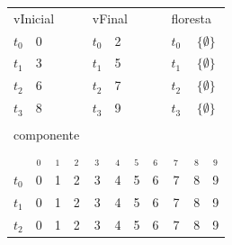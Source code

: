 \documentclass[12pt]{article}
\begin{document}
\begin{figure}[h]
{{				\begin{tabular}{ccccccccccc}
				\multicolumn{4}{l}{vInicial} & \multicolumn{4}{l}{vFinal} & \multicolumn{3}{l}{floresta} \\ \cline{2-2} \cline{6-6} \cline{10-11} 
				\multicolumn{1}{c|}{$t_0$} & \multicolumn{1}{c|}{0} &  &  & \multicolumn{1}{c|}{$t_0$} & \multicolumn{1}{c|}{2} &  &  & \multicolumn{1}{c|}{$t_0$} & \multicolumn{2}{c|}{$\{\emptyset\}$} \\ \cline{2-2} \cline{6-6} \cline{10-11} 
				\multicolumn{1}{c|}{$t_1$} & \multicolumn{1}{c|}{3} &  &  & \multicolumn{1}{c|}{$t_1$} & \multicolumn{1}{c|}{5} &  &  & \multicolumn{1}{c|}{$t_1$} & \multicolumn{2}{c|}{$\{\emptyset\}$} \\ \cline{2-2} \cline{6-6} \cline{10-11} 
				\multicolumn{1}{c|}{$t_2$} & \multicolumn{1}{c|}{6} &  &  & \multicolumn{1}{c|}{$t_2$} & \multicolumn{1}{c|}{7} &  &  & \multicolumn{1}{c|}{$t_2$} & \multicolumn{2}{c|}{$\{\emptyset\}$} \\ \cline{2-2} \cline{6-6} \cline{10-11} 
				\multicolumn{1}{c|}{$t_3$} & \multicolumn{1}{c|}{8} &  &  & \multicolumn{1}{c|}{$t_3$} & \multicolumn{1}{c|}{9} &  &  & \multicolumn{1}{c|}{$t_3$} & \multicolumn{2}{c|}{$\{\emptyset\}$} \\ \cline{2-2} \cline{6-6} \cline{10-11} 
				&  &  &  &  &  &  &  &  &  &  \\
				\multicolumn{11}{l}{componente} \\
				& $ _0$ & $ _1$ & $ _2$ & $ _3$ & $ _4$ & $ _5$ & $ _6$ & $ _7$ & $ _8$ & $ _9$ \\ \cline{2-11} 
				\multicolumn{1}{c|}{$t_0$} & \multicolumn{1}{c|}{0} & \multicolumn{1}{c|}{1} & \multicolumn{1}{c|}{2} & \multicolumn{1}{c|}{3} & \multicolumn{1}{c|}{4} & \multicolumn{1}{c|}{5} & \multicolumn{1}{c|}{6} & \multicolumn{1}{c|}{7} & \multicolumn{1}{c|}{8} & \multicolumn{1}{c|}{9} \\ \cline{2-11} 
				\multicolumn{1}{c|}{$t_1$} & \multicolumn{1}{c|}{0} & \multicolumn{1}{c|}{1} & \multicolumn{1}{c|}{2} & \multicolumn{1}{c|}{3} & \multicolumn{1}{c|}{4} & \multicolumn{1}{c|}{5} & \multicolumn{1}{c|}{6} & \multicolumn{1}{c|}{7} & \multicolumn{1}{c|}{8} & \multicolumn{1}{c|}{9} \\ \cline{2-11} 
				\multicolumn{1}{c|}{$t_2$} & \multicolumn{1}{c|}{0} & \multicolumn{1}{c|}{1} & \multicolumn{1}{c|}{2} & \multicolumn{1}{c|}{3} & \multicolumn{1}{c|}{4} & \multicolumn{1}{c|}{5} & \multicolumn{1}{c|}{6} & \multicolumn{1}{c|}{7} & \multicolumn{1}{c|}{8} & \multicolumn{1}{c|}{9} \\ \cline{2-11} 

\end{tabular}}}
\end{figure}
\end{document}
